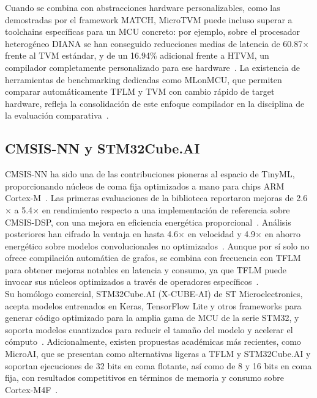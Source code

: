 \documentclass[a4paper,12pt,twoside,final]{book}
\begin{document}
Cuando se combina con abstracciones hardware personalizables, como las demostradas por el framework MATCH, MicroTVM
puede incluso superar a toolchains específicas para un MCU concreto: por ejemplo, sobre el procesador heterogéneo
DIANA se han conseguido reducciones medias de latencia de 60.87$\times$ frente al TVM estándar, y de un 16.94\%
adicional frente a HTVM, un compilador completamente personalizado para ese hardware~\cite{hamdi2025tcas}. La
existencia de herramientas de benchmarking dedicadas como MLonMCU, que permiten comparar automáticamente TFLM y TVM
con cambio rápido de target hardware, refleja la consolidación de este enfoque compilador en la disciplina de la
evaluación comparativa~\cite{vankempen2024mlonmcu}.

\subsection{CMSIS-NN y STM32Cube.AI}
CMSIS-NN ha sido una de las contribuciones pioneras al espacio de TinyML, proporcionando núcleos de coma fija
optimizados a mano para chips ARM Cortex-M~\cite{somvanshi2025acm}. Las primeras evaluaciones de la biblioteca
reportaron mejoras de 2.6$\times$ a 5.4$\times$ en rendimiento respecto a una implementación de referencia sobre
CMSIS-DSP, con una mejora en eficiencia energética proporcional~\cite{lai2018cmsisnn}. Análisis posteriores han
cifrado la ventaja en hasta 4.6$\times$ en velocidad y 4.9$\times$ en ahorro energético sobre modelos
convolucionales no optimizados~\cite{lê2025tist}. Aunque por sí solo no ofrece compilación automática de grafos, se
combina con frecuencia con TFLM para obtener mejoras notables en latencia y consumo, ya que TFLM puede invocar sus
núcleos optimizados a través de operadores específicos~\cite{somvanshi2025acm}.\\

Su homólogo comercial, STM32Cube.AI (X-CUBE-AI) de ST Microelectronics, acepta modelos entrenados en Keras,
TensorFlow Lite y otros frameworks para generar código optimizado para la amplia gama de MCU de la serie STM32, y
soporta modelos cuantizados para reducir el tamaño del modelo y acelerar el cómputo~\cite{wang2020ieejiot}.
Adicionalmente, existen propuestas académicas más recientes, como MicroAI, que se presentan como alternativas
ligeras a TFLM y STM32Cube.AI y soportan ejecuciones de 32 bits en coma flotante, así como de 8 y 16 bits en coma
fija, con resultados competitivos en términos de memoria y consumo sobre Cortex-M4F~\cite{novac2021sensors}.
\end{document}
